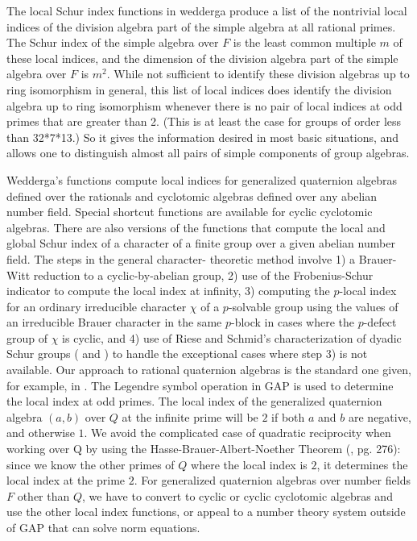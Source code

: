 \documentclass[a4paper,11pt]{report}
\begin{document}
{{ The local Schur index functions in wedderga produce a list of the nontrivial
local indices of the division algebra part of the simple algebra at all
rational primes. The Schur index of the simple algebra over $F$ is the least common multiple $m$ of these local indices, and the dimension of the division algebra part of the
simple algebra over $F$ is $m^2$. While not sufficient to identify these division algebras up to ring
isomorphism in general, this list of local indices does identify the division
algebra up to ring isomorphism whenever there is no pair of local indices at
odd primes that are greater than 2. (This is at least the case for groups of
order less than 3\texttt{}2*7*13.) So it gives the information
desired in most basic situations, and allows one to distinguish almost all
pairs of simple components of group algebras. 

 Wedderga's functions compute local indices for generalized quaternion algebras
defined over the rationals and cyclotomic algebras defined over any abelian
number field. Special shortcut functions are available for cyclic cyclotomic
algebras. There are also versions of the functions that compute the local and
global Schur index of a character of a finite group over a given abelian
number field. The steps in the general character- theoretic method involve 1)
a Brauer-Witt reduction to a cyclic-by-abelian group, 2) use of the
Frobenius-Schur indicator to compute the local index at infinity, 3) computing
the $p$-local index for an ordinary irreducible character $\chi$ of a $p$-solvable group using the values of an irreducible Brauer character in the
same $p$-block in cases where the $p$-defect group of $\chi$ is cyclic, and 4) use of Riese and Schmid's characterization of dyadic Schur
groups (\cite{Sch} and \cite{RSch}) to handle the exceptional cases where step 3) is not available. Our approach
to rational quaternion algebras is the standard one given, for example, in \cite{Pi}. The Legendre symbol operation in GAP is used to determine the local index at
odd primes. The local index of the generalized quaternion algebra $(a,b)$ over $Q$ at the infinite prime will be $2$ if both $a$ and $b$ are negative, and otherwise $1$. We avoid the complicated case of quadratic reciprocity when working over Q
by using the Hasse-Brauer-Albert-Noether Theorem (\cite{R}, pg. 276): since we know the other primes of $Q$ where the local index is $2$, it determines the local index at the prime $2$. For generalized quaternion algebras over number fields $F$ other than $Q$, we have to convert to cyclic or cyclic cyclotomic algebras and use the other
local index functions, or appeal to a number theory system outside of GAP that
can solve norm equations. 

}}
\end{document}
